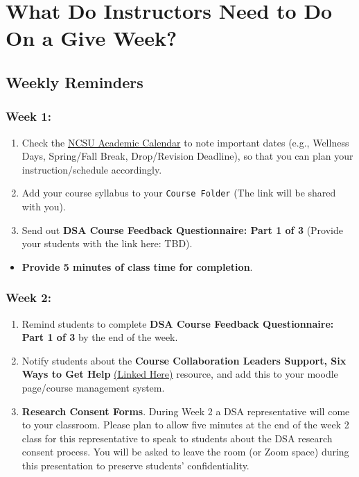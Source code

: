 \documentclass[
]{book}
\providecommand{\tightlist}{%
  \setlength{\itemsep}{0pt}\setlength{\parskip}{0pt}}
\begin{document}
\hfill\break

\chapter{What Do Instructors Need to Do On a Give Week?}\label{what-do-instructors-need-to-do-on-a-give-week}

\section{Weekly Reminders}\label{weekly-reminders}

\subsection{Week 1:}\label{week-1}

\begin{enumerate}
\def\labelenumi{\arabic{enumi})}
\item
  Check the \href{https://studentservices.ncsu.edu/calendars/academic/}{NCSU Academic Calendar} to note important dates (e.g., Wellness Days, Spring/Fall Break, Drop/Revision Deadline), so that you can plan your instruction/schedule accordingly.
\item
  Add your course syllabus to your \texttt{Course\ Folder} (The link will be shared with you).
\item
  Send out { \textbf{DSA Course Feedback Questionnaire: Part 1 of 3} } (Provide your students with the link here: TBD).
\end{enumerate}

\begin{itemize}
\tightlist
\item
  \textbf{Provide 5 minutes of class time for completion}.
\end{itemize}

\subsection{Week 2:}\label{week-2}

\begin{enumerate}
\def\labelenumi{\arabic{enumi})}
\item
  Remind students to complete \textbf{DSA Course Feedback Questionnaire: Part 1 of 3} by the end of the week.
\item
  Notify students about the \textbf{Course Collaboration Leaders Support, Six Ways to Get Help} \href{https://docs.google.com/document/d/1HHNjCbm_W4CEdBWgecMDRpI64hqvmsZZ1Tq8qpudjWo/edit?usp=sharing}{(Linked Here)} resource, and add this to your moodle page/course management system.
\item
  \textbf{Research Consent Forms}. During Week 2 a DSA representative will come to your classroom. Please plan to allow five minutes at the end of the week 2 class for this representative to speak to students about the DSA research consent process. You will be asked to leave the room (or Zoom space) during this presentation to preserve students' confidentiality.
\end{enumerate}
\end{document}
